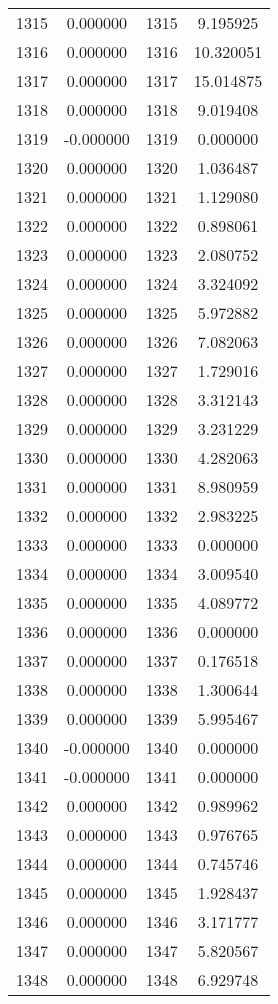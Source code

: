 \documentclass[12pt]{article}
\begin{document}
\begin{longtable}{@{}cccc@{}}
1315 & 0.000000 & 1315 & 9.195925 \\
1316 & 0.000000 & 1316 & 10.320051 \\
1317 & 0.000000 & 1317 & 15.014875 \\
1318 & 0.000000 & 1318 & 9.019408 \\
1319 & -0.000000 & 1319 & 0.000000 \\
1320 & 0.000000 & 1320 & 1.036487 \\
1321 & 0.000000 & 1321 & 1.129080 \\
1322 & 0.000000 & 1322 & 0.898061 \\
1323 & 0.000000 & 1323 & 2.080752 \\
1324 & 0.000000 & 1324 & 3.324092 \\
1325 & 0.000000 & 1325 & 5.972882 \\
1326 & 0.000000 & 1326 & 7.082063 \\
1327 & 0.000000 & 1327 & 1.729016 \\
1328 & 0.000000 & 1328 & 3.312143 \\
1329 & 0.000000 & 1329 & 3.231229 \\
1330 & 0.000000 & 1330 & 4.282063 \\
1331 & 0.000000 & 1331 & 8.980959 \\
1332 & 0.000000 & 1332 & 2.983225 \\
1333 & 0.000000 & 1333 & 0.000000 \\
1334 & 0.000000 & 1334 & 3.009540 \\
1335 & 0.000000 & 1335 & 4.089772 \\
1336 & 0.000000 & 1336 & 0.000000 \\
1337 & 0.000000 & 1337 & 0.176518 \\
1338 & 0.000000 & 1338 & 1.300644 \\
1339 & 0.000000 & 1339 & 5.995467 \\
1340 & -0.000000 & 1340 & 0.000000 \\
1341 & -0.000000 & 1341 & 0.000000 \\
1342 & 0.000000 & 1342 & 0.989962 \\
1343 & 0.000000 & 1343 & 0.976765 \\
1344 & 0.000000 & 1344 & 0.745746 \\
1345 & 0.000000 & 1345 & 1.928437 \\
1346 & 0.000000 & 1346 & 3.171777 \\
1347 & 0.000000 & 1347 & 5.820567 \\
1348 & 0.000000 & 1348 & 6.929748 \\

\end{longtable}
\end{document}
